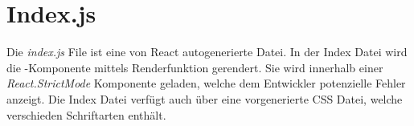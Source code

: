 \section{Index.js}
\label{index}

Die \textit{index.js} File ist eine von React autogenerierte Datei. In der Index Datei wird die 
-Komponente mittels Renderfunktion gerendert. Sie wird innerhalb einer 
\textit{React.StrictMode} Komponente geladen, welche dem Entwickler potenzielle Fehler anzeigt.
Die Index Datei verfügt auch über eine vorgenerierte CSS Datei, welche verschieden Schriftarten 
enthält. 